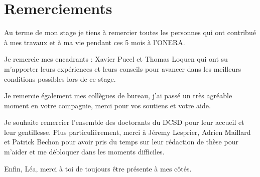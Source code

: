 \chapter*{Remerciements}
Au terme de mon stage je tiens à remercier toutes les personnes qui ont contribué à mes travaux et à ma vie pendant ces 5 mois à l'ONERA.

Je remercie mes encadrants : Xavier Pucel et Thomas Loquen qui ont su m'apporter leurs expériences et leurs conseils pour avancer dans les meilleurs conditions possibles lors de ce stage.

Je remercie également mes collègues de bureau, j'ai passé un très agréable moment en votre compagnie, merci pour vos soutiens et votre aide.

Je souhaite remercier l'ensemble des doctorants du DCSD pour leur accueil et leur gentillesse. Plus particulièrement, merci à Jéremy Lesprier, Adrien Maillard et Patrick Bechon pour avoir pris du temps sur leur rédaction de thèse pour m'aider et me débloquer dans les moments difficiles.  

Enfin, Léa, merci à toi de toujours être présente à mes côtés.
